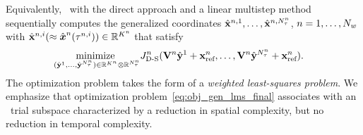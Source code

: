 Equivalently, \methodAcronym\ with the direct approach and a linear multistep method sequentially computes the generalized
	coordinates
	$\hat{\mathbf{x}}^{n,1},\ldots,\hat{\mathbf{x}}^{n,N_{\tau}^{n}}$,
	$n=1,\ldots,N_w$ 
with $\hat{\mathbf{x}}^{n,i}(\approx
	\hat{ \boldsymbol x}^{n}(\tau^{n,i}))\in\mathbb{R}^{K^{n}}$
	that satisfy
\begin{equation}\label{eq:obj_gen_lms_final}
\begin{split}
	&
	\underset{(\hat{\mathbf{y}}^{1},\ldots,\hat{\mathbf{y}}^{N_{\tau}^{n}})\in\mathbb{R}^{K^{n}}\otimes \mathbb{R}^{N_{\tau}^{n}}}{\text{minimize } }
J^{n}_{\text{D-S}} (\mathbf {V}^{n} \hat{\mathbf{y}}^{1} + \mathbf{x}_\text{ref}^{n},\ldots,\mathbf {V}^{n} \hat{\mathbf{y}}^{N_{\tau}^{n}} + \mathbf{x}_\text{ref}^{n}). 
\end{split}
\end{equation}
The optimization problem takes the form of a \textit{weighted least-squares
	problem}. 
We emphasize that optimization problem~\eqref{eq:obj_gen_lms_final} associates
	with an \spatialAcronym\ trial subspace characterized by a reduction in
	spatial complexity, but no reduction in temporal complexity.
 
